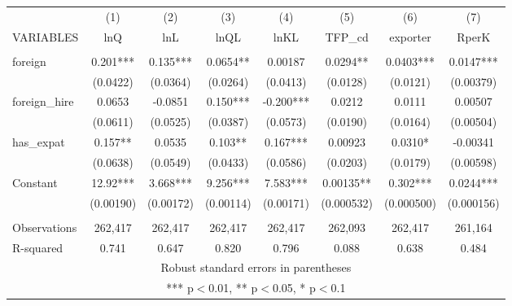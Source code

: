 \begin{tabular}{lccccccc} \hline
 & (1) & (2) & (3) & (4) & (5) & (6) & (7) \\
VARIABLES & lnQ & lnL & lnQL & lnKL & TFP\_cd & exporter & RperK \\ \hline
 &  &  &  &  &  &  &  \\
foreign & 0.201*** & 0.135*** & 0.0654** & 0.00187 & 0.0294** & 0.0403*** & 0.0147*** \\
 & (0.0422) & (0.0364) & (0.0264) & (0.0413) & (0.0128) & (0.0121) & (0.00379) \\
foreign\_hire & 0.0653 & -0.0851 & 0.150*** & -0.200*** & 0.0212 & 0.0111 & 0.00507 \\
 & (0.0611) & (0.0525) & (0.0387) & (0.0573) & (0.0190) & (0.0164) & (0.00504) \\
has\_expat & 0.157** & 0.0535 & 0.103** & 0.167*** & 0.00923 & 0.0310* & -0.00341 \\
 & (0.0638) & (0.0549) & (0.0433) & (0.0586) & (0.0203) & (0.0179) & (0.00598) \\
Constant & 12.92*** & 3.668*** & 9.256*** & 7.583*** & 0.00135** & 0.302*** & 0.0244*** \\
 & (0.00190) & (0.00172) & (0.00114) & (0.00171) & (0.000532) & (0.000500) & (0.000156) \\
 &  &  &  &  &  &  &  \\
Observations & 262,417 & 262,417 & 262,417 & 262,417 & 262,093 & 262,417 & 261,164 \\
 R-squared & 0.741 & 0.647 & 0.820 & 0.796 & 0.088 & 0.638 & 0.484 \\ \hline
\multicolumn{8}{c}{ Robust standard errors in parentheses} \\
\multicolumn{8}{c}{ *** p$<$0.01, ** p$<$0.05, * p$<$0.1} \\
\end{tabular}
